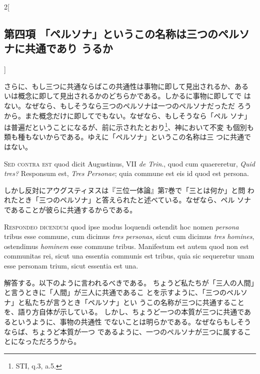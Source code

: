 \documentclass[paper=a4paper,fontsize=10pt,jafontsize=9pt,titlepage]{jlreq}
\begin{document}
\begin{paracol}{2}[\subsection{第四項 「ペルソナ」というこの名称は三つのペルソナに共通であり うるか}]
\switchcolumn


さらに、もし三つに共通ならばこの共通性は事物に即して見出されるか、ある
 いは概念に即して見出されるかのどちらかである。しかるに事物に即してで
 はない。なぜなら、もしそうなら三つのペルソナは一つのペルソナだっただ
 ろうから。また概念だけに即してでもない。なぜなら、もしそうなら「ペル
 ソナ」は普遍だということになるが、前に示されたとおり\footnote{STI,
 q.3, a.5.}、神において不変
 も個別も類も種もないからである。ゆえに「ペルソナ」というこの名称は三
 つに共通ではない。


\switchcolumn*[\subsection{s.c.}]


{\scshape Sed contra est} quod dicit Augustinus, VII {\itshape de Trin}., quod cum
quaereretur, {\itshape Quid tres?} Responsum est, {\itshape Tres Personae}; quia commune est
eis id quod est persona.


\switchcolumn


しかし反対にアウグスティヌスは『三位一体論』第7巻で「三とは何か」と問
 われたとき「三つのペルソナ」と答えられたと述べている。なぜなら、ペル
 ソナであることが彼らに共通するからである。




{\scshape Respondeo dicendum} quod ipse modus loquendi ostendit hoc nomen {\itshape persona}
tribus esse commune, cum dicimus {\itshape tres personas}, sicut cum dicimus {\itshape tres
homines}, ostendimus {\itshape hominem} esse commune tribus. Manifestum est autem
quod non est communitas rei, sicut una essentia communis est tribus,
quia sic sequeretur unam esse personam trium, sicut essentia est
una.


\switchcolumn


解答する。以下のように言われるべきである。
ちょうど私たちが「三人の人間」と言うときに「人間」が三人に共通であるこ
 とを示すように、「三つのペルソナ」と私たちが言うとき「ペルソナ」とい
 うこの名称が三つに共通することを、語り方自体が示している。
しかし、ちょうど一つの本質が三つに共通であるというように、事物の共通性
 でないことは明らかである。なぜならもしそうならば、ちょうど本質が一つ
 であるように、一つのペルソナが三つに属することになっただろうから。


\switchcolumn*



\end{paracol}
\end{document}
